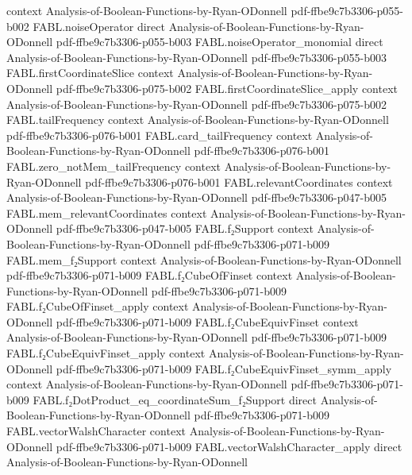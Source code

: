 \begin{theorem}
  {context}
  {Analysis-of-Boolean-Functions-by-Ryan-ODonnell}
  {pdf-ffbe9c7b3306-p055-b002}
\proofstep
  {FABL.noiseOperator}
  {direct}
  {Analysis-of-Boolean-Functions-by-Ryan-ODonnell}
  {pdf-ffbe9c7b3306-p055-b003}
\proofstep
  {FABL.noiseOperator_monomial}
  {direct}
  {Analysis-of-Boolean-Functions-by-Ryan-ODonnell}
  {pdf-ffbe9c7b3306-p055-b003}
\proofstep
  {FABL.firstCoordinateSlice}
  {context}
  {Analysis-of-Boolean-Functions-by-Ryan-ODonnell}
  {pdf-ffbe9c7b3306-p075-b002}
\proofstep
  {FABL.firstCoordinateSlice_apply}
  {context}
  {Analysis-of-Boolean-Functions-by-Ryan-ODonnell}
  {pdf-ffbe9c7b3306-p075-b002}
\proofstep
  {FABL.tailFrequency}
  {context}
  {Analysis-of-Boolean-Functions-by-Ryan-ODonnell}
  {pdf-ffbe9c7b3306-p076-b001}
\proofstep
  {FABL.card_tailFrequency}
  {context}
  {Analysis-of-Boolean-Functions-by-Ryan-ODonnell}
  {pdf-ffbe9c7b3306-p076-b001}
\proofstep
  {FABL.zero_notMem_tailFrequency}
  {context}
  {Analysis-of-Boolean-Functions-by-Ryan-ODonnell}
  {pdf-ffbe9c7b3306-p076-b001}
\proofstep
  {FABL.relevantCoordinates}
  {context}
  {Analysis-of-Boolean-Functions-by-Ryan-ODonnell}
  {pdf-ffbe9c7b3306-p047-b005}
\proofstep
  {FABL.mem_relevantCoordinates}
  {context}
  {Analysis-of-Boolean-Functions-by-Ryan-ODonnell}
  {pdf-ffbe9c7b3306-p047-b005}
\proofstep
  {FABL.f₂Support}
  {context}
  {Analysis-of-Boolean-Functions-by-Ryan-ODonnell}
  {pdf-ffbe9c7b3306-p071-b009}
\proofstep
  {FABL.mem_f₂Support}
  {context}
  {Analysis-of-Boolean-Functions-by-Ryan-ODonnell}
  {pdf-ffbe9c7b3306-p071-b009}
\proofstep
  {FABL.f₂CubeOfFinset}
  {context}
  {Analysis-of-Boolean-Functions-by-Ryan-ODonnell}
  {pdf-ffbe9c7b3306-p071-b009}
\proofstep
  {FABL.f₂CubeOfFinset_apply}
  {context}
  {Analysis-of-Boolean-Functions-by-Ryan-ODonnell}
  {pdf-ffbe9c7b3306-p071-b009}
\proofstep
  {FABL.f₂CubeEquivFinset}
  {context}
  {Analysis-of-Boolean-Functions-by-Ryan-ODonnell}
  {pdf-ffbe9c7b3306-p071-b009}
\proofstep
  {FABL.f₂CubeEquivFinset_apply}
  {context}
  {Analysis-of-Boolean-Functions-by-Ryan-ODonnell}
  {pdf-ffbe9c7b3306-p071-b009}
\proofstep
  {FABL.f₂CubeEquivFinset_symm_apply}
  {context}
  {Analysis-of-Boolean-Functions-by-Ryan-ODonnell}
  {pdf-ffbe9c7b3306-p071-b009}
\proofstep
  {FABL.f₂DotProduct_eq_coordinateSum_f₂Support}
  {direct}
  {Analysis-of-Boolean-Functions-by-Ryan-ODonnell}
  {pdf-ffbe9c7b3306-p071-b009}
\proofstep
  {FABL.vectorWalshCharacter}
  {context}
  {Analysis-of-Boolean-Functions-by-Ryan-ODonnell}
  {pdf-ffbe9c7b3306-p071-b009}
\proofstep
  {FABL.vectorWalshCharacter_apply}
  {direct}
  {Analysis-of-Boolean-Functions-by-Ryan-ODonnell}

\end{theorem}
